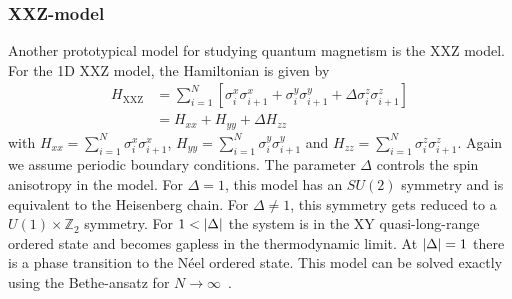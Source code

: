 \documentclass[
 aps,
 pra,
 showpacs,
 showkeys,
 superscriptaddress,
 reprint,%
twocolumn,
]{revtex4-1}
\begin{document}
        \subsubsection{XXZ-model}
        Another prototypical model for studying quantum magnetism is the XXZ model.
        For the 1D XXZ model, the Hamiltonian is given by
        \begin{align}\label{eq:ham_xxz}
            H_{\text{XXZ}} &= \sum_{i=1}^N\left[\sigma_i^x \sigma_{i+1}^x +  \sigma_i^y \sigma_{i+1}^y  +  \Delta \sigma_i^z \sigma_{i+1}^z \right] \nonumber \\ 
            &= H_{xx} + H_{yy} + \Delta H_{zz}
        \end{align}
        with $H_{xx} = \sum^N_{i=1}\sigma_i^x \sigma_{i+1}^x$, $H_{yy} = \sum^N_{i=1}\sigma_i^y \sigma_{i+1}^y$ and $H_{zz} = \sum^N_{i=1}\sigma_i^z \sigma_{i+1}^z$. Again we assume periodic boundary conditions. The parameter $\Delta$ controls the spin anisotropy in the model. For $\Delta=1$, this model has an $SU(2)$ symmetry and is equivalent to the Heisenberg chain. For $\Delta\neq1$, this symmetry gets reduced to a $U(1) \times \mathbb{Z}_2$ symmetry. 
        For $1<\abs{\Delta}$ the system is in the XY quasi-long-range ordered state and becomes gapless in the  thermodynamic limit. 
        At $\abs{\Delta}=1$ there is a phase transition to the N\'eel ordered state. This model can be solved exactly using the Bethe-ansatz for $N\to \infty$~\cite{Franchini2017integrable}. 
        
\end{document}
